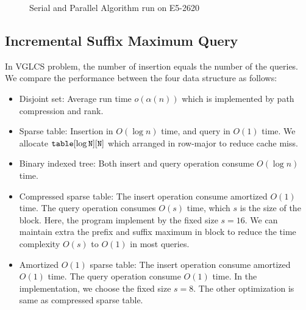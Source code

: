 \iffalse
我們運行優化策略中的空間壓縮版本，而非理論分析的 $\theta(1)$ 操作，
單次詢問落在 $O(s)$ 中，在實作上由於可以完全壓在暫存器上操作，效能表現較佳。
\fi

\begin{figure}
  \centering
  \caption{Serial and Parallel Algorithm run on E5-2620}
\end{figure}



\subsection{Incremental Suffix Maximum Query}

In VGLCS problem, the number of insertion equals the number of the
queries. We compare the performance between the four data structure as
follows:

\iffalse
針對插入和詢問次數相同的 ISMQ 問題，運行以下四種數據結構：
\fi

\begin{itemize}
  \item 

Disjoint set: Average run time $o(\alpha(n))$ which is implemented by
path compression and rank.

  \item 

Sparse table: Insertion in $O(\log n)$ time, and query in $O(1)$ time.
We allocate $\tt{table}[\log N][N]$ which arranged in row-major to
reduce cache miss.

  \item 

Binary indexed tree: Both insert and query operation consume $O(\log
n)$ time.

  \item 

Compressed sparse table: The insert operation consume amortized
$O(1)$ time.  The query operation consumes $O(s)$ time, which $s$ is the
size of the block.  Here, the program implement by the fixed size $s =
16$.  We can maintain extra the prefix and suffix maximum in block to
reduce the time complexity $O(s)$ to $O(1)$ in most queries.

  \item

Amortized $O(1)$ sparse table:  The insert operation consume amortized
$O(1)$ time.  The query operation consume $O(1)$ time.  In the
implementation, we choose the fixed size $s = 8$.  The other
optimization is same as compressed sparse table.

\end{itemize}

